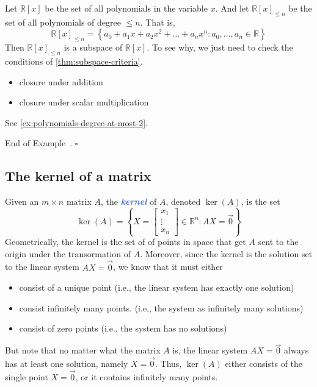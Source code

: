\documentclass[10pt]{article}
\newcommand{\demph}[1]{\textcolor{RoyalBlue}{\textbf{\slshape #1}}} %
\theoremstyle{definition}
\newtheorem{example}[theorem]{Example}
\renewenvironment{example}
{\begin{oldexample}}
  {\par\smallskip\hfill   End of Example~\theexample. $\square$    \par\end{oldexample}}
\newcommand{\R}{\mathbb{R}}           %
\begin{document}
\begin{example}
  Let $\R[x]$ be the set of all polynomials in the variable $x$. And let
  $\R[x]_{ \leq n}$ be the set of all polynomials of degree $ \leq n$. That is,
  \begin{equation*}
    \R[x]_{ \leq n} = \left\{a_{0}+a_{1}x+a_{2}x^{2}+\ldots+a_{n}x^{n}: a_{0},\ldots,a_{n}\in \R\right\} 
  \end{equation*}
  Then $\R[x]_{ \leq n}$ is a subspace of $\R[x]$. To see why, we just need to
  check the conditions of \cref{thm:subspace-criteria}.
  \begin{itemize}
    \item closure under addition
    \item closure under scalar multiplication
  \end{itemize}
  See \cref{ex:polynomials-degree-at-most-2}.
\end{example}


\subsection{The kernel of a matrix}
Given an $m\times n$ matrix $A$, the \demph{kernel} of $A$, denoted $\ker(A)$,
is the set
\begin{equation*}
  \ker(A) =  \left\{X=
    \begin{bmatrix}
      x_{1}\\\vdots\\x_{n}
    \end{bmatrix}\in \R^{n}
    : AX=\vec{0}
  \right\} 
\end{equation*}
Geometrically, the kernel is the set of of points in space that get $A$ sent
to the origin under the transormation of $A$. Moreover, since the kernel is
the solution set to the linear system $AX=\vec{0}$, we know that it must
either
\begin{itemize}
  \item consist of a unique point (i.e., the linear system has exactly one solution)
  \item consist infinitely many points. (i.e., the system as infinitely many
  solutions)
  \item consist of zero points (i.e., the system has no solutions)
\end{itemize}
But note that no matter what the matrix $A$ is, the linear system $AX=\vec{0}$
always has at least one solution, namely $X=\vec{0}$. Thus, $\ker(A)$ either
consists of the single point $X=\vec{0}$, or it contains infinitely many points.
\end{document}
